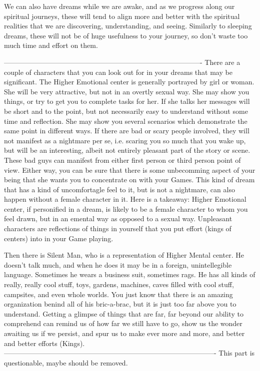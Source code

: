 \documentclass[12pt,letterpaper]{book}
\begin{document}
We can also have dreams while we are awake, and as we progress along our spiritual journeys, these will tend to align more and better with the spiritual realities that we are discovering, understanding, and seeing. Similarly to sleeping dreams, these will not be of huge usefulness to your journey, so don't waste too much time and effort on them.


-------------------------------------------------------------------------------------
There are a couple of characters that you can look out for in your dreams that may be significant. The Higher Emotional center is generally portrayed by girl or woman. She will be very attractive, but not in an overtly sexual way. She may show you things, or try to get you to complete tasks for her. If she talks her messages will be short and to the point, but not necessarily easy to understand without some time and reflection. She may show you several scenarios which demonstrate the same point in different ways. If there are bad or scary people involved, they will not manifest as a nightmare per se, i.e. scaring you so much that you wake up, but will be an interesting, albeit not entirely pleasant part of the story or scene. These bad guys can manifest from either first person or third person point of view. Either way, you can be sure that there is some unbecomming aspect of your being that she wants you to concentrate on with your Games. This kind of dream that has a kind of uncomfortagle feel to it, but is not a nightmare, can also happen without a female character in it. Here is a takeaway: Higher Emotional center, if personified in a dream, is likely to be a female character to whom you feel drawn, but in an emental way as opposed to a sexual way. Unpleasant characters are reflections of things in yourself that you put effort (kings of centers) into in your Game playing.

Then there is Silent Man, who is a representation of Higher Mental center. He doesn't talk much, and when he does it may be in a foreign, unintellegible language. Sometimes he wears a business suit, sometimes rags. He has all kinds of really, really cool stuff, toys, gardens, machines, caves filled with cool stuff, campsites, and even whole worlds. You just know that there is an amazing organization benind all of his bric-a-brac, but it is just too far above you to understand. Getting a glimpse of things that are far, far beyond our ability to comprehend can remind us of how far we still have to go, show us the wonder awaiting us if we persist, and spur us to make ever more and more, and better and better efforts (Kings).
-------------------------------------------------------------------------------------------
This part is questionable, maybe should be removed.
\end{document}
